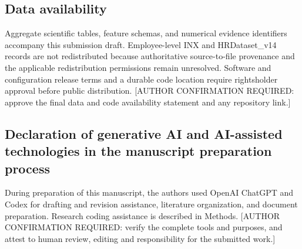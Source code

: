 \documentclass[
  a4paper,
  review]{elsarticle}
\begin{document}
\subsection{Data availability}\label{data-availability}

Aggregate scientific tables, feature schemas, and numerical evidence
identifiers accompany this submission draft. Employee-level INX and
HRDataset\_v14 records are not redistributed because authoritative
source-to-file provenance and the applicable redistribution permissions
remain unresolved. Software and configuration release terms and a
durable code location require rightsholder approval before public
distribution. {[}AUTHOR CONFIRMATION REQUIRED: approve the final data
and code availability statement and any repository link.{]}

\subsection{Declaration of generative AI and AI-assisted technologies in
the manuscript preparation
process}\label{declaration-of-generative-ai-and-ai-assisted-technologies-in-the-manuscript-preparation-process}

During preparation of this manuscript, the authors used OpenAI ChatGPT
and Codex for drafting and revision assistance, literature organization,
and document preparation. Research coding assistance is described in
Methods. {[}AUTHOR CONFIRMATION REQUIRED: verify the complete tools and
purposes, and attest to human review, editing and responsibility for the
submitted work.{]}
\end{document}

